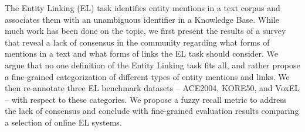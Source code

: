 The Entity Linking (EL) task identifies entity mentions in a text corpus and associates them with an unambiguous identifier in a Knowledge Base. While much work has been done on the topic, we first present the results of a survey that reveal a lack of consensus in the community regarding what forms of mentions in a text and what forms of links the EL task should consider. We argue that no one definition of the Entity Linking task fits all, and rather propose a fine-grained categorization of different types of entity mentions and links. We then re-annotate three EL benchmark datasets -- ACE2004, KORE50, and VoxEL -- with respect to these categories. We propose a fuzzy recall metric to address the lack of consensus and conclude with fine-grained evaluation results comparing a selection of online EL systems.